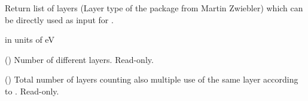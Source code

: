 \documentclass[letterpaper,10pt,english]{sphinxmanual}
\begin{document}
\begin{fulllineitems}
\begin{fulllineitems}
\end{fulllineitems}


\begin{fulllineitems}
\label{\detokenize{modules-api/samplerepresentation:SampleRepresentation.Heterostructure.getSingleEnergyStructure}}
Return list of layers (Layer type of the  package from Martin Zwiebler) which can be directly used as input for .

 in units of eV

\end{fulllineitems}


\begin{fulllineitems}
\label{\detokenize{modules-api/samplerepresentation:SampleRepresentation.Heterostructure.N}}
() Number of different layers. Read-only.

\end{fulllineitems}


\begin{fulllineitems}
\label{\detokenize{modules-api/samplerepresentation:SampleRepresentation.Heterostructure.N_total}}
() Total number of layers counting also multiple use of the same layer according to . Read-only.

\end{fulllineitems}


\end{fulllineitems}

\end{document}
